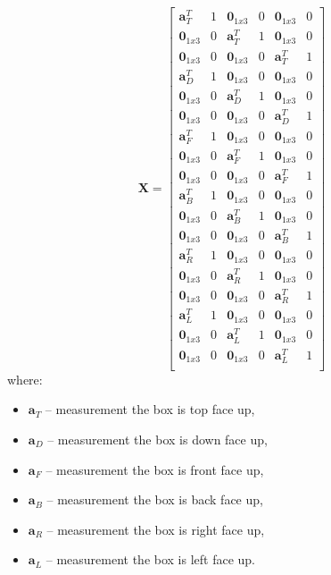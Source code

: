 \begin{equation}
	\bm{X} = 
	\begin{bmatrix}
	\bm{a}^T_T & 1 & \bm{0}_{1x3} & 0 & \bm{0}_{1x3} & 0\\
	\bm{0}_{1x3} & 0 & \bm{a}^T_T & 1 & \bm{0}_{1x3} & 0\\
	\bm{0}_{1x3} & 0 & \bm{0}_{1x3} & 0 & \bm{a}^T_T & 1\\
	
	\bm{a}^T_D & 1 & \bm{0}_{1x3} & 0 & \bm{0}_{1x3} & 0\\
	\bm{0}_{1x3} & 0 & \bm{a}^T_D & 1 & \bm{0}_{1x3} & 0\\
	\bm{0}_{1x3} & 0 & \bm{0}_{1x3} & 0 & \bm{a}^T_D & 1\\
	
	\bm{a}^T_F & 1 & \bm{0}_{1x3} & 0 & \bm{0}_{1x3} & 0\\
	\bm{0}_{1x3} & 0 & \bm{a}^T_F & 1 & \bm{0}_{1x3} & 0\\
	\bm{0}_{1x3} & 0 & \bm{0}_{1x3} & 0 & \bm{a}^T_F & 1\\
	
	\bm{a}^T_B & 1 & \bm{0}_{1x3} & 0 & \bm{0}_{1x3} & 0\\
	\bm{0}_{1x3} & 0 & \bm{a}^T_B & 1 & \bm{0}_{1x3} & 0\\
	\bm{0}_{1x3} & 0 & \bm{0}_{1x3} & 0 & \bm{a}^T_B & 1\\
	
	\bm{a}^T_R & 1 & \bm{0}_{1x3} & 0 & \bm{0}_{1x3} & 0\\
	\bm{0}_{1x3} & 0 & \bm{a}^T_R & 1 & \bm{0}_{1x3} & 0\\
	\bm{0}_{1x3} & 0 & \bm{0}_{1x3} & 0 & \bm{a}^T_R & 1\\
	
	\bm{a}^T_L & 1 & \bm{0}_{1x3} & 0 & \bm{0}_{1x3} & 0\\
	\bm{0}_{1x3} & 0 & \bm{a}^T_L & 1 & \bm{0}_{1x3} & 0\\
	\bm{0}_{1x3} & 0 & \bm{0}_{1x3} & 0 & \bm{a}^T_L & 1\\
	\end{bmatrix} 
	\label{ols_x}
\end{equation}
where:
\begin{itemize}
	\item $\bm{a}_T$ -- measurement the box is top face up,
	\item $\bm{a}_D$ -- measurement the box is down face up,
	\item $\bm{a}_F$ -- measurement the box is front face up,
	\item $\bm{a}_B$ -- measurement the box is back face up,
	\item $\bm{a}_R$ -- measurement the box is right face up,
	\item $\bm{a}_L$ -- measurement the box is left face up.
\end{itemize}


